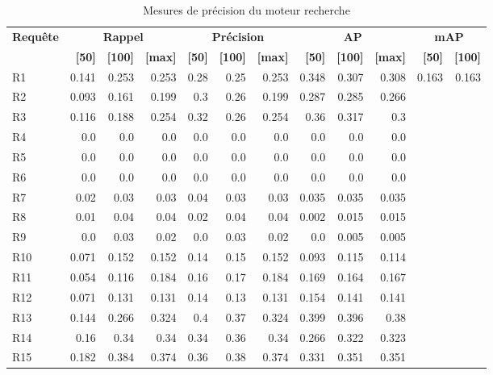\begin{table}[H]
\centering
\begin{tabular}{l|rrr|rrr|rrr|rr}
\toprule
\textbf{Requête} & \multicolumn{3}{c}{\textbf{Rappel}} & \multicolumn{3}{c}{\textbf{Précision}} & \multicolumn{3}{c}{\textbf{AP}} & \multicolumn{2}{c}{\textbf{mAP}} \\
 & \textbf{[50]} & \textbf{[100]} & \textbf{[max]} & \textbf{[50]} & \textbf{[100]} & \textbf{[max]} & \textbf{[50]} & \textbf{[100]} & \textbf{[max]} & \textbf{[50]} & \textbf{[100]} \\
\midrule
R1 & 0.141 & 0.253 & 0.253 & 0.28 & 0.25 & 0.253 & 0.348 & 0.307 & 0.308 & \multirow{15}{*}{0.163} & \multirow{15}{*}{0.163} \\
R2 & 0.093 & 0.161 & 0.199 & 0.3 & 0.26 & 0.199 & 0.287 & 0.285 & 0.266 \\
R3 & 0.116 & 0.188 & 0.254 & 0.32 & 0.26 & 0.254 & 0.36 & 0.317 & 0.3 \\
R4 & 0.0 & 0.0 & 0.0 & 0.0 & 0.0 & 0.0 & 0.0 & 0.0 & 0.0 \\
R5 & 0.0 & 0.0 & 0.0 & 0.0 & 0.0 & 0.0 & 0.0 & 0.0 & 0.0 \\
R6 & 0.0 & 0.0 & 0.0 & 0.0 & 0.0 & 0.0 & 0.0 & 0.0 & 0.0 \\
R7 & 0.02 & 0.03 & 0.03 & 0.04 & 0.03 & 0.03 & 0.035 & 0.035 & 0.035 \\
R8 & 0.01 & 0.04 & 0.04 & 0.02 & 0.04 & 0.04 & 0.002 & 0.015 & 0.015 \\
R9 & 0.0 & 0.03 & 0.02 & 0.0 & 0.03 & 0.02 & 0.0 & 0.005 & 0.005 \\
R10 & 0.071 & 0.152 & 0.152 & 0.14 & 0.15 & 0.152 & 0.093 & 0.115 & 0.114 \\
R11 & 0.054 & 0.116 & 0.184 & 0.16 & 0.17 & 0.184 & 0.169 & 0.164 & 0.167 \\
R12 & 0.071 & 0.131 & 0.131 & 0.14 & 0.13 & 0.131 & 0.154 & 0.141 & 0.141 \\
R13 & 0.144 & 0.266 & 0.324 & 0.4 & 0.37 & 0.324 & 0.399 & 0.396 & 0.38 \\
R14 & 0.16 & 0.34 & 0.34 & 0.34 & 0.36 & 0.34 & 0.266 & 0.322 & 0.323 \\
R15 & 0.182 & 0.384 & 0.374 & 0.36 & 0.38 & 0.374 & 0.331 & 0.351 & 0.351 \\
\bottomrule
\end{tabular}
\caption{Mesures de précision du moteur recherche}
\label{tab:results}
\end{table}
